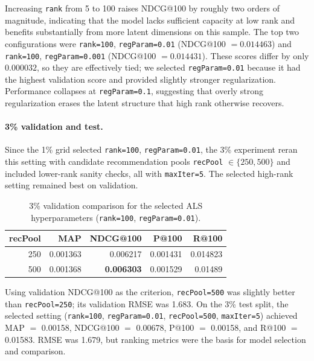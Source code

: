 \documentclass[10pt,twocolumn]{article}
\begin{document}
Increasing \texttt{rank} from 5 to 100 raises NDCG@100 by roughly two orders of magnitude, indicating that the model lacks sufficient capacity at low rank and benefits substantially from more latent dimensions on this sample. The top two configurations were \texttt{rank=100}, \texttt{regParam=0.01} (NDCG@100 $=0.014463$) and \texttt{rank=100}, \texttt{regParam=0.001} (NDCG@100 $=0.014431$). These scores differ by only $0.000032$, so they are effectively tied; we selected \texttt{regParam=0.01} because it had the highest validation score and provided slightly stronger regularization. Performance collapses at \texttt{regParam=0.1}, suggesting that overly strong regularization erases the latent structure that high rank otherwise recovers.

\paragraph{3\% validation and test.} Since the 1\% grid selected \texttt{rank=100}, \texttt{regParam=0.01}, the 3\% experiment reran this setting with candidate recommendation pools \texttt{recPool} $\in \{250, 500\}$ and included lower-rank sanity checks, all with \texttt{maxIter=5}. The selected high-rank setting remained best on validation.

\begin{table}[!ht]
\centering
\caption{3\% validation comparison for the selected ALS hyperparameters (\texttt{rank=100}, \texttt{regParam=0.01}).}
\label{tab:sweep3pct}
\footnotesize
\setlength{\tabcolsep}{3pt}
\begin{tabular}{r r r r r}
\toprule
\textbf{recPool} & \textbf{MAP} & \textbf{NDCG@100} & \textbf{P@100} & \textbf{R@100} \\
\midrule
250 & 0.001363 & 0.006217          & 0.001431 & 0.014823 \\
500 & 0.001368 & \textbf{0.006303} & 0.001529 & 0.01489 \\
\bottomrule
\end{tabular}
\end{table}

Using validation NDCG@100 as the criterion, \texttt{recPool=500} was slightly better than \texttt{recPool=250}; its validation RMSE was 1.683. On the 3\% test split, the selected setting (\texttt{rank=100}, \texttt{regParam=0.01}, \texttt{recPool=500}, \texttt{maxIter=5}) achieved MAP $=$ 0.00158, NDCG@100 $=$ 0.00678, P@100 $=$ 0.00158, and R@100 $=$ 0.01583. RMSE was 1.679, but ranking metrics were the basis for model selection and comparison.
\end{document}
